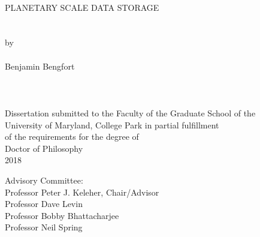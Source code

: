 
\thispagestyle{empty}
\hbox{\ }
\vspace{1in}
\renewcommand{\baselinestretch}{1}
\small\normalsize
\begin{center}

\large{{PLANETARY SCALE DATA STORAGE}}\\
\ \\
\ \\
\large{by} \\
\ \\
\large{Benjamin Bengfort}%
\ \\
\ \\
\ \\
\ \\
\normalsize
Dissertation submitted to the Faculty of the Graduate School of the \\
University of Maryland, College Park in partial fulfillment \\
of the requirements for the degree of \\
Doctor of Philosophy \\
2018
\end{center}

\vspace{7.5em}

\noindent Advisory Committee: \\
Professor Peter J. Keleher, Chair/Advisor \\
Professor Dave Levin \\
Professor Bobby Bhattacharjee \\
Professor Neil Spring
